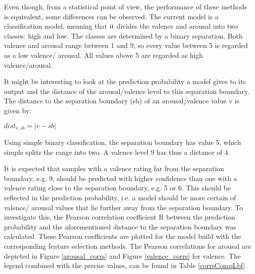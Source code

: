 Even though, from a statistical point of view, the performance of these methods is equivalent, some differences can be observed. The current model is a classification model, meaning that it divides the valence and arousal into two classes: high and low. The classes are determined by a binary separation. Both valence and arousal range between 1 and 9, so every value between 5 is regarded as a low valence/ arousal. All values above 5 are regarded as high valence/arousal.

\npar

It might be interesting to look at the prediction probability a model gives to its output and the distance of the arousal/valence level to this separation boundary. The distance to the separation boundary (sb) of an arousal/valence value v is given by:
\begin{center}
$dist_{v, sb} = | v - sb |$
\end{center}
Using simple binary classification, the separation boundary has value 5, which simple splits the range into two. A valence level 9 has thus a distance of 4.

\npar

It is expected that samples with a valence rating far from the separation boundary, e.g. 9, should be predicted with higher confidence than one with a valence rating close to the separation boundary, e.g. 5 or 6. This should be reflected in the prediction probability, i.e. a model should be more certain of valence/ arousal values that lie further away from the separation boundary. To investigate this, the Pearson correlation coefficient R between the prediction probability and the aforementioned distance to the separation boundary was calculated. These Pearson coefficients are plotted for the model build with the corresponding feature selection methods. The Pearson correlations for arousal are depicted in Figure \ref{arousal_corrs} and Figure \ref{valence_corrs} for valence. The legend combined with the precise values, can be found in Table \ref{corrsCompLbl}.

